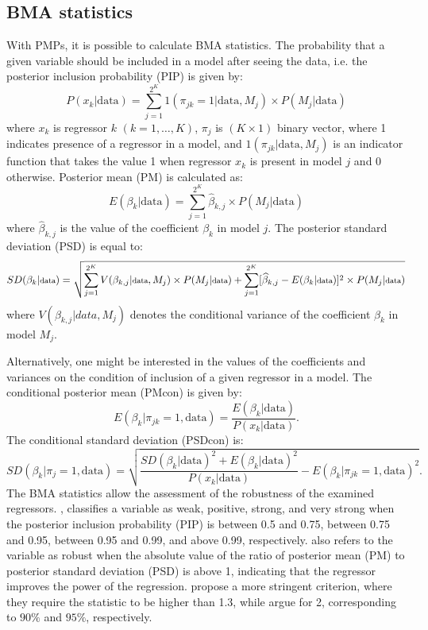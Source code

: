 \documentclass[a4paper]{article}
\begin{document}
\subsection{BMA statistics}
\noindent With PMPs, it is possible to calculate BMA statistics. The probability that a given variable should be included in a model after seeing the data, i.e. the posterior inclusion probability (PIP) is given by:
\begin{equation}
P(x_{k}|\text{data})=\sum_{j=1}^{2^K}1(\pi_{jk}=1|\text{data}, M_{j})\times P(M_{j}|\text{data})
\end{equation}
where $x_{k}$ is regressor $k$ $(k=1, \dots, K)$, $\pi_{j}$ is $(K\times 1)$ binary vector, where 1 indicates presence of a regressor in a model, and $1(\pi_{jk}|\text{data}, M_{j})$ is an indicator function that takes the value 1 when regressor $x_{k}$ is present in model $j$ and 0 otherwise.  Posterior mean (PM) is calculated as:
\begin{equation}\label{pm}
E(\beta_{k}|\text{data})=\sum_{j=1}^{2^K}\widehat{\beta}_{k,j}\times P(M_{j}|\text{data})
\end{equation}
\noindent where $\widehat{\beta}_{k,j}$ is the value of the coefficient $\beta_{k}$ in model $j$. The posterior standard deviation (PSD) is equal to:
\begin{equation}\label{psd}
\fontsize{7.5pt}{9pt}\selectfont
SD(\beta_{k}|\text{data})=\sqrt{\sum_{j=1}^{2^K}V(\beta_{k,j}|\text{data},M_{j})\times P(M_{j}|\text{data})+\sum_{j=1}^{2^K}[\widehat{\beta}_{k,j}-E(\beta_{k}|\text{data})]^{2}\times P(M_{j}|\text{data})}
\end{equation}
\noindent where $V(\beta_{k,j}|data,M_{j})$ denotes the conditional variance of the coefficient $\beta_{k}$ in model $M_{j}$.

\indent Alternatively, one might be interested in the values of the coefficients and variances on the condition of inclusion of a given regressor in a model. The conditional posterior mean (PMcon) is given by:
\begin{equation}
E(\beta_{k}|\pi_{jk}=1,\text{data})=\frac{E(\beta_{k}|\text{data})}{P(x_{k}|\text{data})}.
\end{equation}
The conditional standard deviation (PSDcon) is:
\begin{equation}
    SD(\beta_{k}|\pi_{j}=1,\text{data})=\sqrt{\frac{SD(\beta_{k}|\text{data})^2+E(\beta_{k}|\text{data})^2}{P(x_{k}|\text{data})}-E(\beta_{k}|\pi_{jk}=1,\text{data})^2}.
\end{equation}
\indent The BMA statistics allow the assessment of the robustness of the examined regressors. \citet{Raftery+1995}, classifies a variable as weak, positive, strong, and very strong when the posterior inclusion probability (PIP) is between 0.5 and 0.75, between 0.75 and 0.95, between 0.95 and 0.99, and above 0.99, respectively. \citet{Raftery+1995} also refers to the variable as robust when the absolute value of the ratio of posterior mean (PM) to posterior standard deviation (PSD) is above 1, indicating that the regressor improves the power of the regression. \citet{Masanjala+2008} propose a more stringent criterion, where they require the statistic to be higher than 1.3, while \citet{Sala+2004} argue for 2, corresponding to $90\%$ and $95\%$, respectively.
\end{document}
